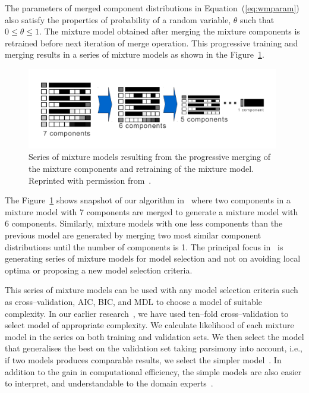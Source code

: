 The parameters of merged component distributions in Equation~(\ref{eq:wmparam})
also satisfy the properties of probability of a random variable, $\theta$ such that
$0 \le \theta \le 1$. The mixture model obtained after merging the mixture
components is retrained before next iteration of merge operation.
This progressive training and merging results in 
a series of mixture models as shown in the Figure~\ref{Fig:series}.

\begin{figure}[h!]
\centering
\includegraphics[trim=10mm 10mm 10mm 2mm,width=0.98\textwidth]{figures/seriesofmodels}
\caption[Series of Mixture Models after Merging and Retraining.]
{Series of mixture models resulting from the progressive 
merging of the mixture components and retraining of the mixture 
model. Reprinted with permission from~.} 
\label{Fig:series}
\end{figure}

The Figure~\ref{Fig:series} shows snapshot of our algorithm in~ 
where two components in a mixture model with 7 components are merged 
to generate a mixture model with 6 components. Similarly, mixture 
models with one less components than the previous model are generated 
by merging two most similar component distributions 
until the number of components is 1. The principal focus in~ is 
generating series of mixture models for model selection 
and not on avoiding local optima or proposing a new 
model selection criteria.

This series of mixture models
can be used with any model selection criteria such as cross--validation,
AIC, BIC, and MDL to choose a model of suitable complexity. In our earlier 
research~\cite{adhikari12ds}, we have used ten--fold cross--validation 
to select model of appropriate complexity. We calculate likelihood of 
each mixture model in the series on both training and validation sets.
We then select the model that generalises the best on the validation
set taking parsimony into account, i.e., if two models produces 
comparable results, we select the simpler model~\cite{zellner2001simplicity}.
In addition to the gain in computational efficiency, the simple models
are also easier to interpret, and understandable to the domain 
experts~\cite{Hollmen2007a}.


